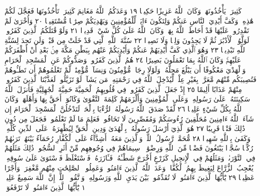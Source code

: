 كَثِيرَةࣰ يَأْخُذُونَهَاۗ وَكَانَ ٱللَّهُ عَزِيزًا حَكِيمࣰا ١٩ وَعَدَكُمُ ٱللَّهُ
مَغَانِمَ كَثِيرَةࣰ تَأْخُذُونَهَا فَعَجَّلَ لَكُمْ هَٰذِهِۦ وَكَفَّ أَيْدِيَ
ٱلنَّاسِ عَنكُمْ وَلِتَكُونَ ءَايَةࣰ لِّلْمُؤْمِنِينَ وَيَهْدِيَكُمْ صِرَٰطࣰا
مُّسْتَقِيمࣰا ٢٠ وَأُخْرَىٰ لَمْ تَقْدِرُوا۟ عَلَيْهَا قَدْ أَحَاطَ ٱللَّهُ بِهَاۚ
وَكَانَ ٱللَّهُ عَلَىٰ كُلِّ شَيْءࣲ قَدِيرࣰا ٢١ وَلَوْ قَٰتَلَكُمُ ٱلَّذِينَ
كَفَرُوا۟ لَوَلَّوُا۟ ٱلْأَدْبَٰرَ ثُمَّ لَا يَجِدُونَ وَلِيࣰّا وَلَا نَصِيرࣰا ٢٢ سُنَّةَ
ٱللَّهِ ٱلَّتِي قَدْ خَلَتْ مِن قَبْلُۖ وَلَن تَجِدَ لِسُنَّةِ ٱللَّهِ تَبْدِيلࣰا ٢٣
وَهُوَ ٱلَّذِي كَفَّ أَيْدِيَهُمْ عَنكُمْ وَأَيْدِيَكُمْ عَنْهُم بِبَطْنِ مَكَّةَ مِنۢ
بَعْدِ أَنْ أَظْفَرَكُمْ عَلَيْهِمْۚ وَكَانَ ٱللَّهُ بِمَا تَعْمَلُونَ بَصِيرًا ٢٤
هُمُ ٱلَّذِينَ كَفَرُوا۟ وَصَدُّوكُمْ عَنِ ٱلْمَسْجِدِ ٱلْحَرَامِ
وَٱلْهَدْيَ مَعْكُوفًا أَن يَبْلُغَ مَحِلَّهُۥۚ وَلَوْلَا رِجَالࣱ مُّؤْمِنُونَ وَنِسَآءࣱ
مُّؤْمِنَٰتࣱ لَّمْ تَعْلَمُوهُمْ أَن تَطَـُٔوهُمْ فَتُصِيبَكُم مِّنْهُم مَّعَرَّةُۢ
بِغَيْرِ عِلْمࣲۖ لِّيُدْخِلَ ٱللَّهُ فِي رَحْمَتِهِۦ مَن يَشَآءُۚ لَوْ تَزَيَّلُوا۟ لَعَذَّبْنَا
ٱلَّذِينَ كَفَرُوا۟ مِنْهُمْ عَذَابًا أَلِيمًا ٢٥ إِذْ جَعَلَ ٱلَّذِينَ كَفَرُوا۟
فِي قُلُوبِهِمُ ٱلْحَمِيَّةَ حَمِيَّةَ ٱلْجَٰهِلِيَّةِ فَأَنزَلَ ٱللَّهُ سَكِينَتَهُۥ
عَلَىٰ رَسُولِهِۦ وَعَلَى ٱلْمُؤْمِنِينَ وَأَلْزَمَهُمْ كَلِمَةَ ٱلتَّقْوَىٰ
وَكَانُوٓا۟ أَحَقَّ بِهَا وَأَهْلَهَاۚ وَكَانَ ٱللَّهُ بِكُلِّ شَيْءٍ عَلِيمࣰا ٢٦
لَّقَدْ صَدَقَ ٱللَّهُ رَسُولَهُ ٱلرُّءْيَا بِٱلْحَقِّۖ لَتَدْخُلُنَّ ٱلْمَسْجِدَ
ٱلْحَرَامَ إِن شَآءَ ٱللَّهُ ءَامِنِينَ مُحَلِّقِينَ رُءُوسَكُمْ وَمُقَصِّرِينَ
لَا تَخَافُونَۖ فَعَلِمَ مَا لَمْ تَعْلَمُوا۟ فَجَعَلَ مِن دُونِ ذَٰلِكَ
فَتْحࣰا قَرِيبًا ٢٧ هُوَ ٱلَّذِيٓ أَرْسَلَ رَسُولَهُۥ بِٱلْهُدَىٰ وَدِينِ
ٱلْحَقِّ لِيُظْهِرَهُۥ عَلَى ٱلدِّينِ كُلِّهِۦۚ وَكَفَىٰ بِٱللَّهِ شَهِيدࣰا ٢٨
مُّحَمَّدࣱ رَّسُولُ ٱللَّهِۚ وَٱلَّذِينَ مَعَهُۥٓ أَشِدَّآءُ عَلَى ٱلْكُفَّارِ رُحَمَآءُ بَيْنَهُمْۖ
تَرَىٰهُمْ رُكَّعࣰا سُجَّدࣰا يَبْتَغُونَ فَضْلࣰا مِّنَ ٱللَّهِ وَرِضْوَٰنࣰاۖ سِيمَاهُمْ
فِي وُجُوهِهِم مِّنْ أَثَرِ ٱلسُّجُودِۚ ذَٰلِكَ مَثَلُهُمْ فِي ٱلتَّوْرَىٰةِۚ وَمَثَلُهُمْ فِي
ٱلْإِنجِيلِ كَزَرْعٍ أَخْرَجَ شَطْـَٔهُۥ فَـَٔازَرَهُۥ فَٱسْتَغْلَظَ فَٱسْتَوَىٰ
عَلَىٰ سُوقِهِۦ يُعْجِبُ ٱلزُّرَّاعَ لِيَغِيظَ بِهِمُ ٱلْكُفَّارَۗ وَعَدَ ٱللَّهُ ٱلَّذِينَ
ءَامَنُوا۟ وَعَمِلُوا۟ ٱلصَّٰلِحَٰتِ مِنْهُم مَّغْفِرَةࣰ وَأَجْرًا عَظِيمَۢا ٢٩
يَٰٓأَيُّهَا ٱلَّذِينَ ءَامَنُوا۟ لَا تُقَدِّمُوا۟ بَيْنَ يَدَيِ ٱللَّهِ وَرَسُولِهِۦۖ وَٱتَّقُوا۟
ٱللَّهَۚ إِنَّ ٱللَّهَ سَمِيعٌ عَلِيمࣱ ١ يَٰٓأَيُّهَا ٱلَّذِينَ ءَامَنُوا۟ لَا تَرْفَعُوٓا۟
